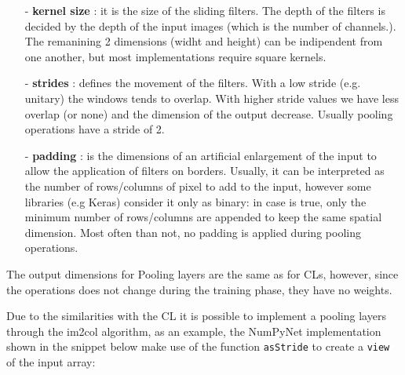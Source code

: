 \documentclass[12pt,a4paper]{report}
\begin{document}
\begin{itemize}
 \setlength\itemsep{-0.2em}
 \item [-] {\bf kernel size} : it is the size of the sliding filters. The depth of the filters is decided by the depth of the input images (which is the number of channels.). The remanining 2 dimensions (widht and height) can be indipendent from one another, but most implementations require square kernels.
 \item [-] {\bf strides} : defines the movement of the filters. With a low stride (e.g. unitary) the windows tends to overlap. With higher stride values we have less overlap (or none) and the dimension of the output decrease. Usually pooling operations have a stride of 2.
 \item [-] {\bf padding} : is the dimensions of an artificial enlargement of the input to allow the application of filters on borders. Usually, it can be interpreted as the number of rows/columns of pixel to add to the input, however some libraries (e.g Keras) consider it only as binary: in case is true, only the minimum number of rows/columns are appended to keep the same spatial dimension. Most often than not, no padding is applied during pooling operations.
\end{itemize}

The output dimensions for Pooling layers are the same as for CLs, however, since the operations does not change during the training phase, they have no weights.

Due to the similarities with the CL it is possible to implement a pooling layers through the im2col algorithm, as an example, the NumPyNet implementation shown in the snippet below make use of the function \texttt{asStride} to create a \texttt{view} of the input array: 
\end{document}
